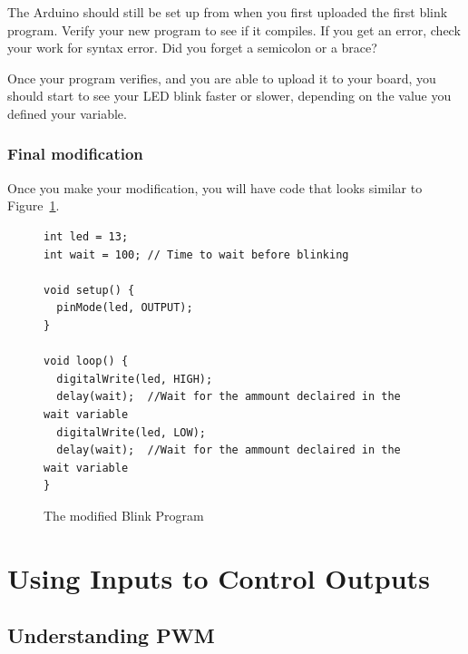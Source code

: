 \documentclass[11pt,a4paper]{article}
\begin{document}
The Arduino should still be set up from when you first uploaded the first blink program.  Verify your new program to see if it compiles.  If you get an error, check your work for syntax error.  Did you forget a semicolon or a brace?

Once your program verifies, and you are able to upload it to your board, you should start to see your LED blink faster or slower, depending on the value you defined your variable.


\subsubsection{Final modification} %
\label{ssub:final_modification}

Once you make your modification, you will have code that looks similar to Figure~\ref{fig:blinkmod}.
\begin{figure}[htbp]
	\centering
\begin{verbatim}
int led = 13;
int wait = 100; // Time to wait before blinking

void setup() {                
  pinMode(led, OUTPUT);     
} 

void loop() {
  digitalWrite(led, HIGH);   
  delay(wait);  //Wait for the ammount declaired in the wait variable         
  digitalWrite(led, LOW);    
  delay(wait);  //Wait for the ammount declaired in the wait variable        
}
\end{verbatim}
	\caption{The modified Blink Program}
	\label{fig:blinkmod}
\end{figure}




\section{Using Inputs to Control Outputs} %
\label{sec:using_inputs_to_control_outputs}

\subsection{Understanding PWM} %
\label{sub:understanding_pwm}
\end{document}
